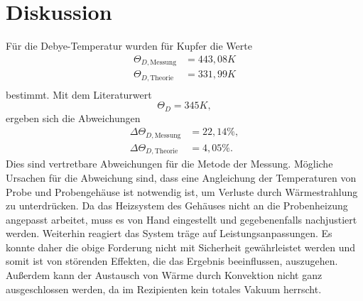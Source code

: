 \section{Diskussion}
\label{sec:Diskussion}
Für die Debye-Temperatur wurden für Kupfer die Werte
\begin{align*}
    \Theta_{D, \text{Messung}} &= 443,08K \\
    \Theta_{D, \text{Theorie}} &= 331,99K \\
\end{align*}
bestimmt.
Mit dem Literaturwert \cite{Lit}
\begin{equation*}
    \Theta_D = 345K,
\end{equation*}
ergeben sich die Abweichungen
\begin{align*}
    \Delta\Theta_{D, \text{Messung}} &= 22,14\%, \\
    \Delta\Theta_{D, \text{Theorie}} &= 4,05 \%.
\end{align*}
Dies sind vertretbare Abweichungen für die Metode der Messung.
Mögliche Ursachen für die Abweichung sind,
dass eine Angleichung der Temperaturen von Probe und Probengehäuse ist notwendig ist, 
um Verluste durch Wärmestrahlung zu unterdrücken. 
Da das Heizsystem des Gehäuses nicht an die Probenheizung angepasst arbeitet, 
muss es von Hand eingestellt und gegebenenfalls nachjustiert werden. 
Weiterhin reagiert das System träge auf Leistungsanpassungen. 
Es konnte daher die obige Forderung nicht mit Sicherheit gewährleistet werden und somit ist von störenden Effekten, 
die das Ergebnis beeinflussen, 
auszugehen. 
Außerdem kann der Austausch von Wärme durch Konvektion nicht ganz ausgeschlossen werden, 
da im Rezipienten kein totales Vakuum herrscht.